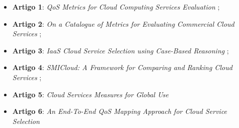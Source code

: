 \documentclass[conference]{IEEEtran}
\begin{document}
      \begin{itemize}
       \item \textbf{Artigo 1}: \textit{QoS Metrics for Cloud Computing Services Evaluation} \cite{bardsiri2014};
       \item \textbf{Artigo 2}: \textit{On a Catalogue of Metrics for Evaluating Commercial Cloud Services} \cite{li2012};
       \item \textbf{Artigo 3}: \textit{IaaS Cloud Service Selection using Case-Based Reasoning} \cite{soltani2016};
       \item \textbf{Artigo 4}: \textit{SMICloud: A Framework for Comparing and Ranking Cloud Services} \cite{garg2011};
       \item \textbf{Artigo 5}: \textit{Cloud Services Measures for Global Use} \cite{siegel2012cloud}
       \item \textbf{Artigo 6}: \textit{An End-To-End QoS Mapping Approach for Cloud Service Selection} \cite{karim2013}
      \end{itemize}
      
\end{document}
